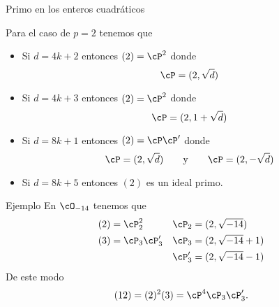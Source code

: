 \begin{frame}{Primo en los enteros cuadráticos}
  \begin{theorem}
    Para el caso de $p = 2$ tenemos que
    \pause\bigskip
    \begin{itemize}[<+->]
      \item Si $d = 4k+2$ entonces $(2) = \cP^2$ donde
      \[
        \cP = (2, \sqrt{d})
      \] 

      \item Si $d = 4k+3$ entonces $(2) = \cP^2$ donde
      \[
        \cP = (2, 1+\sqrt{d})
      \]
      
      \item Si $d = 8k+1$ entonces $(2) = \cP \cP'$ donde
      \[
        \cP = (2, \sqrt{d}) \Eqand \cP = (2, -\sqrt{d})
      \] 

      \item Si $d = 8k+5$ entonces $(2)$ es un ideal primo.
    \end{itemize}
  \end{theorem}
\end{frame}



\begin{frame}{Ejemplo}
  En $\cO_{-14}$ tenemos que
  \begin{align*}
    (2) &= \cP_2^2 & \cP_2 &= (2, \sqrt{-14}) \\
    (3) &= \cP_3 \cP_3'  & \cP_3 &= (2, \sqrt{-14}+1) \\
                      &  & \cP_3' &= (2, \sqrt{-14}-1) \\
  \end{align*}
  De este modo
  \[
    (12) = (2)^2 (3) = \cP^4 \cP_3 \cP_3'.
  \]
\end{frame}